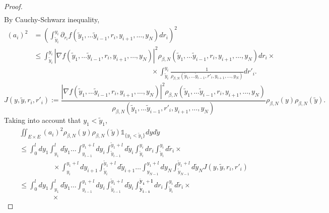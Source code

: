 \documentclass[11pt]{article}
\numberwithin{equation}{section}
\theoremstyle{definition}
\begin{document}
\begin{proof}
\begin{align*}
\end{align*}
By Cauchy-Schwarz inequality,
\begin{align*}
    (a_{i})^{2} &=\left(\int_{\tilde y_{i}}^{y_{i}} \partial_{r_{i}}f(\tilde y_{1},\dots \tilde y_{i-1},  r_{i}, y_{i+1}, \dots, y_{N}) dr_{i}\right)^{2} \\
    &\le \int_{\tilde y_{i}}^{y_{i}} |\nabla f(\tilde y_{1},\dots \tilde y_{i-1},  r_{i}, y_{i+1}, \dots, y_{N})|^{2} \rho_{\beta,N}(\tilde y_{1},\dots \tilde y_{i-1},  r_{i}, y_{i+1}, \dots, y_{N}) dr_{i}\times \\
    &\hspace{7cm}\times\int_{\tilde y_{i}}^{y_{i}} \frac{1}{\rho_{\beta,N}(\tilde y_{1},\dots \tilde y_{i-1},  r'_{i}, y_{i+1}, \dots, y_{N}) }dr'_{i}.
\end{align*}
\[
    J(y, \tilde y, r_{i}, r'_{i}):= \frac{ |\nabla f(\tilde y_{1},\dots \tilde y_{i-1},  r_{i}, y_{i+1}, \dots, y_{N})|^{2} \rho_{\beta,N}(\tilde y_{1},\dots \tilde y_{i-1},  r_{i}, y_{i+1}, \dots, y_{N}) }{\rho_{\beta,N}(\tilde y_{1},\dots \tilde y_{i-1},  r'_{i}, y_{i+1}, \dots, y_{N})}\rho_{\beta,N}(y)\rho_{\beta,N}(\tilde y).
\]
Taking into account that $y_{1} < \tilde  y_{1}$,
\begin{align*}
    &\iint_{E\times E} (a_{i})^{2}\rho_{\beta,N}(y)\rho_{\beta,N}(\tilde y)\mathds{1}_{\{y_{1} < \tilde  y_{1}\}}dyd\tilde y\\
    &\le
    \int_{0}^{l}dy_{1}
    \int_{y_{1}}^{l}d\tilde y_{1}\dots 
    \int_{y_{i-1}}^{y_{1}+l}dy_{i}
    \int_{\tilde y_{i-1}}^{\tilde y_{1}+l}d\tilde y_{i}
    \int_{\tilde y_{i}}^{y_{i}}dr_{i}
    \int_{\tilde y_{i}}^{y_{i}}d\tilde r_{i}\times\\
    &\hspace{2cm}\times\int_{y_{i}}^{y_{1}+l}dy_{i+1}
    \int_{\tilde y_{i}}^{\tilde y_{1}+l}d\tilde y_{i+1}\dots
    \int_{y_{N-1}}^{y_{1}+l}dy_{N}
    \int_{\tilde y_{N-1}}^{\tilde y_{1}+l}d\tilde y_{N}J(y,\tilde y, r_{i}, r'_{i})\\
    &\le
    \int_{0}^{l}dy_{1}
    \int_{y_{1}}^{l}d\tilde y_{1}\dots 
    \int_{y_{i-1}}^{y_{1}+l}dy_{i}
    \int_{\tilde y_{i-1}}^{\tilde y_{1}+l}d\tilde y_{i}
    \int_{\boldsymbol{\tilde y_{i-1}}}^{\boldsymbol{\tilde y_{1}+l}}dr_{i}
    \int_{\tilde y_{i}}^{y_{i}}d\tilde r_{i}\times\\
    &\hspace{2cm}\times

\end{align*}
\end{proof}
\end{document}
